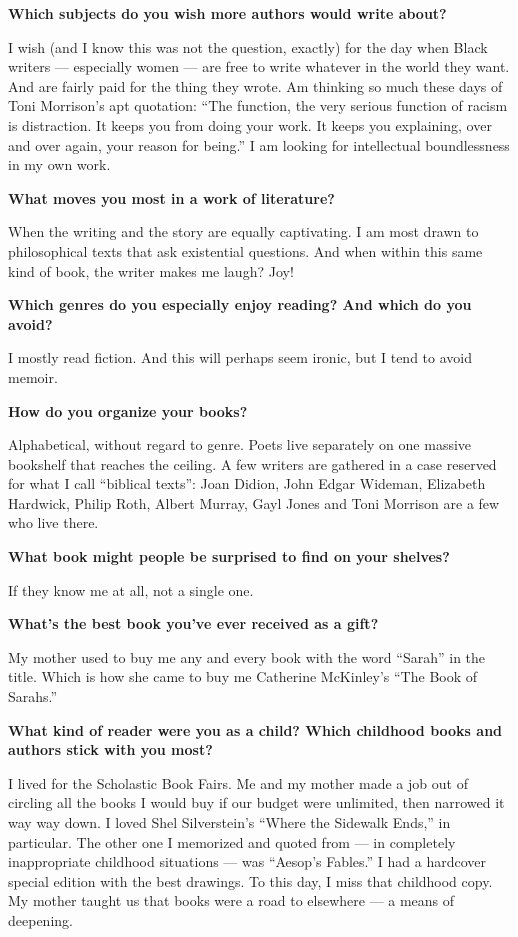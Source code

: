 \textbf{Which subjects do you wish more authors would write about?}

I wish (and I know this was not the question, exactly) for the day when
Black writers --- especially women --- are free to write whatever in the
world they want. And are fairly paid for the thing they wrote. Am
thinking so much these days of Toni Morrison's apt quotation: ``The
function, the very serious function of racism is distraction. It keeps
you from doing your work. It keeps you explaining, over and over again,
your reason for being.'' I am looking for intellectual boundlessness in
my own work.

\textbf{What moves you most in a work of literature?}

When the writing and the story are equally captivating. I am most drawn
to philosophical texts that ask existential questions. And when within
this same kind of book, the writer makes me laugh? Joy!

\textbf{Which genres do you especially enjoy reading? And which do you
avoid?}

I mostly read fiction. And this will perhaps seem ironic, but I tend to
avoid memoir.

\textbf{How do you organize your books?}

Alphabetical, without regard to genre. Poets live separately on one
massive bookshelf that reaches the ceiling. A few writers are gathered
in a case reserved for what I call ``biblical texts'': Joan Didion, John
Edgar Wideman, Elizabeth Hardwick, Philip Roth, Albert Murray, Gayl
Jones and Toni Morrison are a few who live there.

\textbf{What book might people be surprised to find on your shelves?}

If they know me at all, not a single one.

\textbf{What's the best book you've ever received as a gift?}

My mother used to buy me any and every book with the word ``Sarah'' in
the title. Which is how she came to buy me Catherine McKinley's ``The
Book of Sarahs.''

\textbf{What kind of reader were you as a child? Which childhood books
and authors stick with you most?}

I lived for the Scholastic Book Fairs. Me and my mother made a job out
of circling all the books I would buy if our budget were unlimited, then
narrowed it way way down. I loved Shel Silverstein's ``Where the
Sidewalk Ends,'' in particular. The other one I memorized and quoted
from --- in completely inappropriate childhood situations --- was
``Aesop's Fables.'' I had a hardcover special edition with the best
drawings. To this day, I miss that childhood copy. My mother taught us
that books were a road to elsewhere --- a means of deepening.

